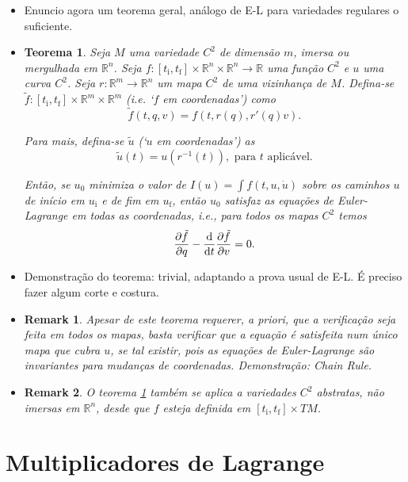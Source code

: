 \documentclass{article}
\theoremstyle{plain}
\newtheorem{theorem}{Teorema}
\theoremstyle{plain}
\newtheorem{remark}{Remark}
\theoremstyle{nonumberplain}
\theoremstyle{empty}
\newcommand{\R}{\mathbb{R}}
\newcommand{\tstart}{\mathrm{i}}
\newcommand{\tend}{\mathrm{f}}
\begin{document}
\begin{itemize}
\item Enuncio agora um teorema geral, análogo de E-L para variedades regulares o suficiente.

\item \begin{theorem}\label{elinmanifolds}
Seja $M$ uma variedade $C^2$ de dimensão $m$, imersa ou mergulhada em $\R^n$. Seja $f : [t_\tstart, t_\tend] \times \R^n \times \R^n \to \R$ uma função $C^2$ e $u$ uma curva $C^2$. Seja $r : \R^m \to \R^n$ um mapa $C^2$ de uma vizinhança de $M$. Defina-se $\tilde f : [t_\tstart, t_\tend] \times \R^m \times \R^m$ (i.e. `$f$ em coordenadas') como
\[ \tilde f(t, q, v) = f(t, r(q), r'(q)v).\]

Para mais, defina-se $\tilde u$ (`$u$ em coordenadas') as
\[\tilde u(t) = u(r^{-1}(t)), \text{ para $t$ aplicável.}\]

Então, se $u_0$ minimiza o valor de $I(u) = \int f(t,u,\dot u)$ sobre os caminhos $u$ de início em $u_\tstart$ e de fim em $u_\tend$, então $u_0$ satisfaz as equações de Euler-Lagrange em todas as coordenadas, i.e., para todos os mapas $C^2$ temos
\[\diffp{\tilde f} q - \diff*{\diffp{\tilde f}v}t = 0.\]
\end{theorem}

\item Demonstração do teorema: trivial, adaptando a prova usual de E-L. É preciso fazer algum corte e costura.

\item \begin{remark}
Apesar de este teorema requerer, a priori, que a verificação seja feita em todos os mapas, basta verificar que a equação é satisfeita num único mapa que cubra $u$, se tal existir, pois as equações de Euler-Lagrange são invariantes para mudanças de coordenadas. Demonstração: Chain Rule.
\end{remark}

\item \begin{remark}
O teorema \ref{elinmanifolds} também se aplica a variedades $C^2$ abstratas, não imersas em $\R^n$, desde que $f$ esteja definida em $[t_\tstart, t_\tend] \times TM$.
\end{remark}
\end{itemize}

\section{Multiplicadores de Lagrange}
\end{document}
